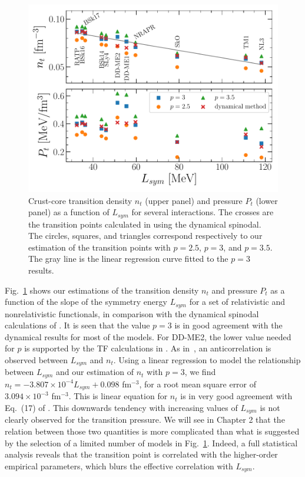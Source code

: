 \begin{figure}[!t]
\begin{center}
  \includegraphics[width=0.9\linewidth]{figures/cctp_lsym.pdf}
\end{center}
\caption[Crust-core transition density and pressure for several interactions]{Crust-core 
  transition density $n_t$ (upper panel) and pressure $P_t$ 
(lower panel) as a function of $L_{sym}$ for several interactions. The crosses 
are the transition points calculated in \cite{Ducoin2011} using the dynamical
spinodal. The circles, squares, and triangles correspond respectively to our
estimation of the transition points with $p=2.5$, $p=3$, 
and $p=3.5$. The gray line is the linear regression curve fitted to the $p=3$ 
results.}\label{fig:cctp_lsym}
\end{figure}

Fig.~\ref{fig:cctp_lsym} shows our estimations of the transition density $n_t$ 
and pressure $P_t$ as a function of the slope of the symmetry energy $L_{sym}$ 
for a set of relativistic and nonrelativistic functionals, in 
comparison with the dynamical spinodal calculations of \cite{Ducoin2011}. It is
seen that the value $p=3$ is in good agreement with the dynamical results for
most of the models. For DD-ME2, the lower value needed for $p$ is supported by
the TF calculations in \cite{Grill2012}. 
As in~\cite{Vinas2017}, an anticorrelation is observed between $L_{sym}$ and 
$n_t$. Using a linear regression to model the relationship between $L_{sym}$
and our estimation of $n_t$ with $p=3$, we find $n_t = -3.807\times
10^{-4}L_{sym} + 0.098$ fm$^{-3}$, for a root mean square error of 
$3.094\times 10^{-3}$ fm$^{-3}$. This is linear equation for $n_t$ is in very
good agreement with Eq.~(17) of \cite{Ducoin2011}.
This downwards tendency with increasing values of $L_{sym}$ is not clearly 
observed for the transition pressure. {We will see in Chapter 2 that the 
  relation between those two quantities is more complicated than what is
suggested by the selection of a limited number of models in
Fig.~\ref{fig:cctp_lsym}. Indeed, a full statistical analysis reveals that the
transition point is correlated with the higher-order empirical parameters,
which blurs the effective correlation with $L_{sym}$.}

